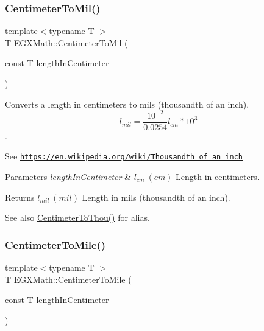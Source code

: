 \subsubsection{\texorpdfstring{Centimeter\+To\+Mil()}{CentimeterToMil()}}
{\footnotesize\ttfamily template$<$typename T $>$ \\
T E\+G\+X\+Math\+::\+Centimeter\+To\+Mil (\begin{DoxyParamCaption}\item[{const T}]{length\+In\+Centimeter }\end{DoxyParamCaption})}



Converts a length in centimeters to mils (thousandth of an inch). \[ l_{mil}= \frac{10^{-2}}{0.0254} l_{cm} * 10^{3} \]. 

See \href{https://en.wikipedia.org/wiki/Thousandth_of_an_inch}{\tt https\+://en.\+wikipedia.\+org/wiki/\+Thousandth\+\_\+of\+\_\+an\+\_\+inch} 
\begin{DoxyParams}{Parameters}
{\em length\+In\+Centimeter} & $ l_{cm}\ (cm)$ Length in centimeters. \\
\hline
\end{DoxyParams}
\begin{DoxyReturn}{Returns}
$ l_{mil}\ (mil)$ Length in mils (thousandth of an inch). 
\end{DoxyReturn}
\begin{DoxySeeAlso}{See also}
\mbox{\hyperlink{group___e_g_x_math-_conversions-_length_conversions-_s_i-_centimeter-_imperial_ga06aee91cfbc90db20c6a085129dbf4fa}{Centimeter\+To\+Thou()}} for alias. 
\end{DoxySeeAlso}
\mbox{\label{group___e_g_x_math-_conversions-_length_conversions-_s_i-_centimeter-_imperial_gacba2e8c1f187fae381009e4413d5d4fb}} 
\subsubsection{\texorpdfstring{Centimeter\+To\+Mile()}{CentimeterToMile()}}
{\footnotesize\ttfamily template$<$typename T $>$ \\
T E\+G\+X\+Math\+::\+Centimeter\+To\+Mile (\begin{DoxyParamCaption}\item[{const T}]{length\+In\+Centimeter }\end{DoxyParamCaption})}



